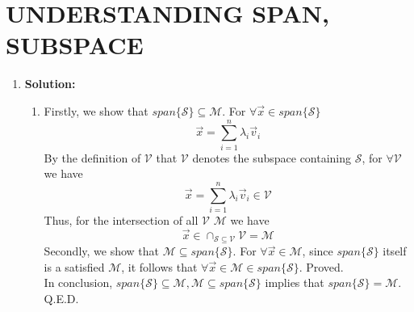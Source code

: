 \section{UNDERSTANDING SPAN, SUBSPACE}

\begin{enumerate}
	
	\item \textbf{Solution:}
	\begin{enumerate}
	\item Firstly, we show that $span\{\mathcal{S}\}\subseteq\mathcal{M}$. For $\forall \vec{x}\in span\{\mathcal{S}\}$
	$$\vec{x}=\sum_{i=1}^{n}\lambda_i\vec{v}_i$$
	By the definition of $\mathcal{V}$ that $\mathcal{V}$  denotes the subspace containing $\mathcal{S}$, for 
	$\forall \mathcal{V}$ we have 
	$$\vec{x}=\sum_{i=1}^{n}\lambda_i\vec{v}_i\in \mathcal{V}$$
	Thus, for the intersection of all $\mathcal{V}$ $\mathcal{M}$ we have
	$$\vec{x}\in \cap_{\mathcal{S}\subseteq\mathcal{V}}\mathcal{V}=\mathcal{M}$$
	Secondly, we show that $\mathcal{M}\subseteq span\{\mathcal{S}\}$. For $\forall \vec{x}\in \mathcal{M}$, since $span\{\mathcal{S}\}$ itself is a satisfied $\mathcal{M}$, it follows that $\forall \vec{x} \in \mathcal{M} \in span\{\mathcal{S}\}$. Proved.\\
	In conclusion, $span\{\mathcal{S}\}\subseteq\mathcal{M}, \mathcal{M}\subseteq span\{\mathcal{S}\}$ implies that $span\{\mathcal{S}\}=\mathcal{M}$. Q.E.D.
	
	\end{enumerate}

\end{enumerate}